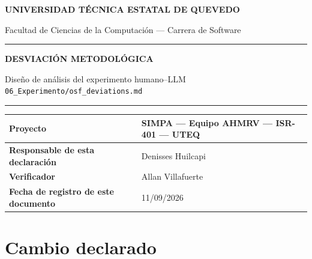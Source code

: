 \documentclass[11pt,a4paper]{article}
\begin{document}
\begin{center}
{\large\bfseries UNIVERSIDAD TÉCNICA ESTATAL DE QUEVEDO\par}
{\normalsize Facultad de Ciencias de la Computación --- Carrera de Software\par}
\vspace{0.5cm}
\rule{\textwidth}{1pt}\par
\vspace{0.3cm}
{\LARGE\bfseries\color{uteqverde} DESVIACIÓN METODOLÓGICA\par}
\vspace{0.25cm}
{\large Diseño de análisis del experimento humano--LLM\\
\texttt{06\_Experimento/osf\_deviations.md}\par}
\vspace{0.3cm}
\rule{\textwidth}{1pt}\par
\end{center}

\vspace{0.3cm}
\begin{longtable}{|L{4.5cm}|L{10.3cm}|}
\hline
{} \textbf{Proyecto} & SIMPA --- Equipo AHMRV --- ISR-401 --- UTEQ \\ \hline
\textbf{Responsable de esta declaración} & Denisses Huilcapi \\ \hline
\textbf{Verificador} & Allan Villafuerte \\ \hline
\textbf{Fecha de registro de este documento} & 11/09/2026 \\ \hline
\end{longtable}

\section{Cambio declarado}
\end{document}
